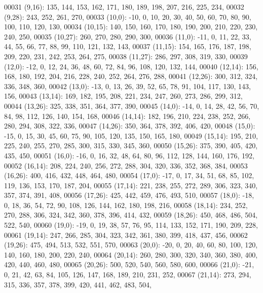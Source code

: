 \begin{DoxyCode}
00031       (9,16): 135, 144, 153, 162, 171, 180, 189, 198, 207, 216, 225, 234,
00032       (9,28): 243, 252, 261, 270,
00033       (10,0): -10, 0, 10, 20, 30, 40, 50, 60, 70, 80, 90, 100, 110, 120, 130,
00034       (10,15): 140, 150, 160, 170, 180, 190, 200, 210, 220, 230, 240, 250,
00035       (10,27): 260, 270, 280, 290, 300,
00036       (11,0): -11, 0, 11, 22, 33, 44, 55, 66, 77, 88, 99, 110, 121, 132, 143,
00037       (11,15): 154, 165, 176, 187, 198, 209, 220, 231, 242, 253, 264, 275,
00038       (11,27): 286, 297, 308, 319, 330,
00039       (12,0): -12, 0, 12, 24, 36, 48, 60, 72, 84, 96, 108, 120, 132, 144,
00040       (12,14): 156, 168, 180, 192, 204, 216, 228, 240, 252, 264, 276, 288,
00041       (12,26): 300, 312, 324, 336, 348, 360,
00042       (13,0): -13, 0, 13, 26, 39, 52, 65, 78, 91, 104, 117, 130, 143, 156,
00043       (13,14): 169, 182, 195, 208, 221, 234, 247, 260, 273, 286, 299, 312,
00044       (13,26): 325, 338, 351, 364, 377, 390,
00045       (14,0): -14, 0, 14, 28, 42, 56, 70, 84, 98, 112, 126, 140, 154, 168,
00046       (14,14): 182, 196, 210, 224, 238, 252, 266, 280, 294, 308, 322, 336,
00047       (14,26): 350, 364, 378, 392, 406, 420,
00048       (15,0): -15, 0, 15, 30, 45, 60, 75, 90, 105, 120, 135, 150, 165, 180,
00049       (15,14): 195, 210, 225, 240, 255, 270, 285, 300, 315, 330, 345, 360,
00050       (15,26): 375, 390, 405, 420, 435, 450,
00051       (16,0): -16, 0, 16, 32, 48, 64, 80, 96, 112, 128, 144, 160, 176, 192,
00052       (16,14): 208, 224, 240, 256, 272, 288, 304, 320, 336, 352, 368, 384,
00053       (16,26): 400, 416, 432, 448, 464, 480,
00054       (17,0): -17, 0, 17, 34, 51, 68, 85, 102, 119, 136, 153, 170, 187, 204,
00055       (17,14): 221, 238, 255, 272, 289, 306, 323, 340, 357, 374, 391, 408,
00056       (17,26): 425, 442, 459, 476, 493, 510,
00057       (18,0): -18, 0, 18, 36, 54, 72, 90, 108, 126, 144, 162, 180, 198, 216,
00058       (18,14): 234, 252, 270, 288, 306, 324, 342, 360, 378, 396, 414, 432,
00059       (18,26): 450, 468, 486, 504, 522, 540,
00060       (19,0): -19, 0, 19, 38, 57, 76, 95, 114, 133, 152, 171, 190, 209, 228,
00061       (19,14): 247, 266, 285, 304, 323, 342, 361, 380, 399, 418, 437, 456,
00062       (19,26): 475, 494, 513, 532, 551, 570,
00063       (20,0): -20, 0, 20, 40, 60, 80, 100, 120, 140, 160, 180, 200, 220, 240,
00064       (20,14): 260, 280, 300, 320, 340, 360, 380, 400, 420, 440, 460, 480,
00065       (20,26): 500, 520, 540, 560, 580, 600,
00066       (21,0): -21, 0, 21, 42, 63, 84, 105, 126, 147, 168, 189, 210, 231, 252,
00067       (21,14): 273, 294, 315, 336, 357, 378, 399, 420, 441, 462, 483, 504,

\end{DoxyCode}
